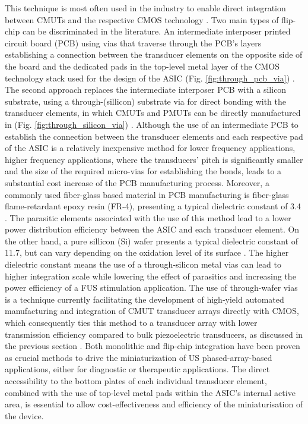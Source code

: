 This technique is most often used in the industry to enable direct integration between CMUTs and the respective CMOS technology \cite{}. Two main types of flip-chip can be discriminated in the literature. An intermediate interposer printed circuit board (PCB) using vias that traverse through the PCB's layers establishing a connection between the transducer elements on the opposite side of the board and the dedicated pads in the top-level metal layer of the CMOS technology stack used for the design of the ASIC (Fig. \ref{fig:through_pcb_via}) \cite{HassanThesisRef182,194}. The second approach replaces the intermediate interposer PCB with a silicon substrate, using a through-(sillicon) substrate via for direct bonding with the transducer elements, in which CMUTs and PMUTs can be directly manufactured in (Fig. \ref{fig:through_silicon_via}) \cite{HassanThesisRef182,193}. Although the use of an intermediate PCB to establish the connection between the transducer elements and each respective pad of the ASIC is a relatively inexpensive method for lower frequency applications, higher frequency applications, where the transducers' pitch is significantly smaller and the size of the required micro-vias for establishing the bonds, leads to a substantial cost increase of the PCB manufacturing process. Moreover, a commonly used fiber-glass based material in PCB manufacturing is fiber-glass flame-retardant epoxy resin (FR-4), presenting a typical dielectric constant of 3.4 \cite{https://www.atlasfibre.com/material/fr-4/, https://link.springer.com/article/10.1007/BF02657420}. The parasitic elements associated with the use of this method lead to a lower power distribution efficiency between the ASIC and each transducer element. On the other hand, a pure sillicon (Si) wafer presents a typical dielectric constant of 11.7, but can vary depending on the oxidation level of its surface \cite{https://iopscience.iop.org/article/10.1088/2053-1591/abf684}. The higher dielectric constant means the use of a through-silicon metal vias can lead to higher integration scale while lowering the effect of parasitics and increasing the power efficiency of a FUS stimulation application. The use of through-wafer vias is a technique currently facilitating the development of high-yield automated manufacturing and integration of CMUT transducer arrays directly with CMOS, which consequently ties this method to a transducer array with lower transmission efficiency compared to bulk piezoelectric transducers, as discussed in the previous section \cite{}. 
Both monolithic and flip-chip integration have been proven as crucial methods to drive the miniaturization of US phased-array-based applications, either for diagnostic or therapeutic applications. The direct accessibility to the bottom plates of each individual transducer element, combined with the use of top-level metal pads within the ASIC's internal active area, is essential to allow cost-effectiveness and efficiency of the miniaturisation of the device. 
